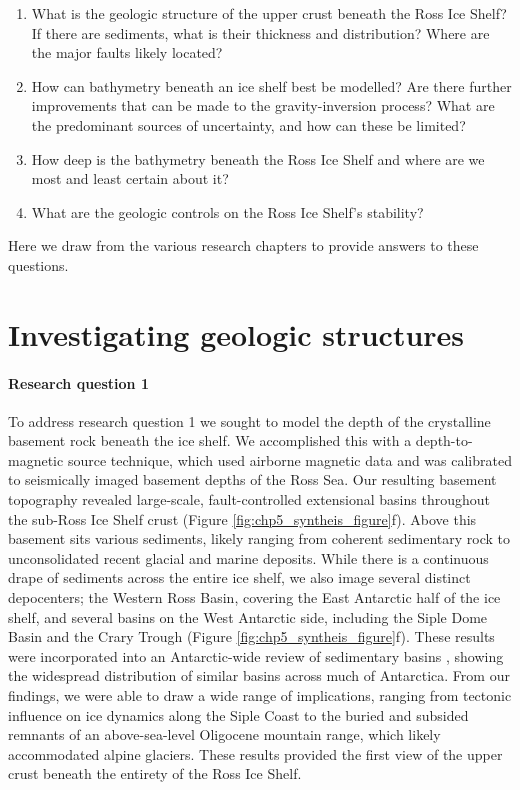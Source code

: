 \begin{enumerate}
    \item 
        What is the geologic structure of the upper crust beneath the Ross Ice Shelf? 
        If there are sediments, what is their thickness and distribution? 
        Where are the major faults likely located? 
    \item 
        How can bathymetry beneath an ice shelf best be modelled? 
        Are there further improvements that can be made to the gravity-inversion process? 
        What are the predominant sources of uncertainty, and how can these be limited? 
    \item 
        How deep is the bathymetry beneath the Ross Ice Shelf and where are we most and least certain about it? 
    \item 
        What are the geologic controls on the Ross Ice Shelf's stability? 
\end{enumerate}

Here we draw from the various research chapters to provide answers to these questions. 


\section[Geologic structures]{Investigating geologic structures}
\paragraph*{Research question 1}

To address research question 1 we sought to model the depth of the crystalline basement rock beneath the ice shelf. We accomplished this with a depth-to-magnetic source technique, which used airborne magnetic data and was calibrated to seismically imaged basement depths of the Ross Sea. Our resulting basement topography revealed large-scale, fault-controlled extensional basins throughout the sub-Ross Ice Shelf crust (Figure \ref{fig:chp5_syntheis_figure}f). Above this basement sits various sediments, likely ranging from coherent sedimentary rock to unconsolidated recent glacial and marine deposits. While there is a continuous drape of sediments across the entire ice shelf, we also image several distinct depocenters; the Western Ross Basin, covering the East Antarctic half of the ice shelf, and several basins on the West Antarctic side, including the Siple Dome Basin and the Crary Trough (Figure \ref{fig:chp5_syntheis_figure}f). These results were incorporated into an Antarctic-wide review of sedimentary basins \citep[Figure \ref{fig:chp5_syntheis_figure}a][]{aitkenantarctica2023}, showing the widespread distribution of similar basins across much of Antarctica. From our findings, we were able to draw a wide range of implications, ranging from tectonic influence on ice dynamics along the Siple Coast to the buried and subsided remnants of an above-sea-level Oligocene mountain range, which likely accommodated alpine glaciers. These results provided the first view of the upper crust beneath the entirety of the Ross Ice Shelf. \\

